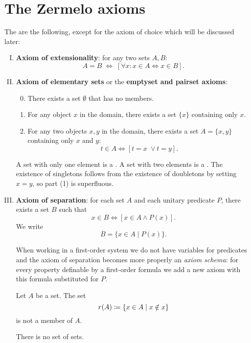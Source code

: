 \section{The Zermelo axioms}
The  are the following, except for the axiom of choice which will be discussed later:
\begin{enumerate}[(I)]
\item \textbf{Axiom of extensionality}: for any two sets $A,B$:
\[ A=B \;\iff\; \left[\forall x:x\in A\iff x\in B\right]. \]
\item \textbf{Axiom of elementary sets} or the \textbf{emptyset and pairset axioms}:
\begin{enumerate}[(1)] \setcounter{enumii}{-1}
\item There exists a set $\emptyset$ that has no members.
\item For any object $x$ in the domain, there exists a set $\{x\}$ containing only $x$.
\item For any two objects $x,y$ in the domain, there exists a set $A = \{x,y\}$ containing only $x$ and $y$:
\[ t\in A \iff [t=x\;\lor t=y]. \]
\end{enumerate}
\begin{note}
A set with only one element is a . A set with two elements is a . The existence of singletons follows from the existence of doubletons by setting $x=y$, so part (1) is superfluous.
\end{note}
\item \textbf{Axiom of separation}: for each set $A$ and each unitary predicate $P$, there exists a set $B$ such that
\[ x\in B \iff [x\in A \land P(x)]. \]
We write
\[ B = \{x\in A\;|\; P(x)\}. \]
\begin{note}
When working in a first-order system we do not have variables for predicates and the axiom of separation becomes more properly an \emph{axiom schema}: for every property definable by a first-order formula we add a new axiom with this formula substituted for $P$.
\end{note}
\begin{note}
\begin{proposition} \label{prop:russelParadox}
Let $A$ be a set. The set
\[ r(A) \coloneqq \{ x\in A\;|\; x\notin x \} \]
is not a member of $A$.
\end{proposition}
\begin{corollary} \label{corollary:setOfSets}
There is no set of sets.
\end{corollary}
\end{note}

\end{enumerate}
